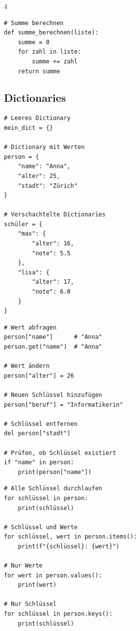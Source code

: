\begin{landscape}
\begin{multicols*}{4}
\begin{cheatSheetBox}[title=Algorithmen mit Listen]
\begin{lstlisting}
# Summe berechnen
def summe_berechnen(liste):
    summe = 0
    for zahl in liste:
        summe += zahl
    return summe
\end{lstlisting}
		\end{cheatSheetBox}

		\columnbreak\textcolor{\cheatSheetColor}{\subsection*{Dictionaries}}

		\begin{cheatSheetBox}[title=Dictionary erstellen]
			\begin{lstlisting}
# Leeres Dictionary
mein_dict = {}

# Dictionary mit Werten
person = {
    "name": "Anna",
    "alter": 25,
    "stadt": "Zürich"
}

# Verschachtelte Dictionaries
schüler = {
    "max": {
        "alter": 16,
        "note": 5.5
    },
    "lisa": {
        "alter": 17,
        "note": 6.0
    }
}
\end{lstlisting}
		\end{cheatSheetBox}

		\begin{cheatSheetBox}[title=Auf Dictionary zugreifen]
			\begin{lstlisting}
# Wert abfragen
person["name"]      # "Anna"
person.get("name")  # "Anna"

# Wert ändern
person["alter"] = 26

# Neuen Schlüssel hinzufügen
person["beruf"] = "Informatikerin"

# Schlüssel entfernen
del person["stadt"]

# Prüfen, ob Schlüssel existiert
if "name" in person:
    print(person["name"])
\end{lstlisting}
		\end{cheatSheetBox}

		\begin{cheatSheetBox}[title=Dictionary durchlaufen]
			\begin{lstlisting}
# Alle Schlüssel durchlaufen
for schlüssel in person:
    print(schlüssel)

# Schlüssel und Werte
for schlüssel, wert in person.items():
    print(f"{schlüssel}: {wert}")

# Nur Werte
for wert in person.values():
    print(wert)

# Nur Schlüssel
for schlüssel in person.keys():
    print(schlüssel)
\end{lstlisting}
		\end{cheatSheetBox}


\end{multicols*}
\end{landscape}
